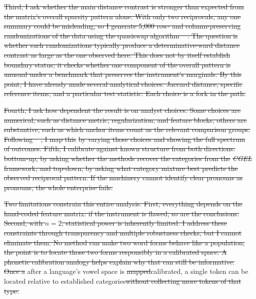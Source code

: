 \documentclass[12pt]{article}
\providecommand{\DIFaddtex}[1]{{\protect\color{DIFgreen}#1}} %
\providecommand{\DIFdeltex}[1]{{\protect\color{red}\sout{#1}}}                      %
\providecommand{\DIFaddbegin}{} %
\providecommand{\DIFaddend}{} %
\providecommand{\DIFdelbegin}{} %
\providecommand{\DIFdelend}{} %
\providecommand{\DIFadd}[1]{\texorpdfstring{\DIFaddtex{#1}}{#1}} %
\providecommand{\DIFdel}[1]{\texorpdfstring{\DIFdeltex{#1}}{}} %
\newcommand{\DIFscaledelfig}{0.5}
\newlength{\DIFdelgraphicswidth} %
\newlength{\DIFdelgraphicsheight} %
\newcommand{\DIFaddincludegraphics}[2][]{{\color{DIFgreen}\fbox{\DIFOincludegraphics[#1]{#2}}}} %
\newcommand{\DIFdelincludegraphics}[2][]{%
\sbox{\DIFdelgraphicsbox}{\DIFOincludegraphics[#1]{#2}}%
\settoboxwidth{\DIFdelgraphicswidth}{\DIFdelgraphicsbox} %
\settoboxtotalheight{\DIFdelgraphicsheight}{\DIFdelgraphicsbox} %
\scalebox{\DIFscaledelfig}{%
\parbox[b]{\DIFdelgraphicswidth}{\usebox{\DIFdelgraphicsbox}\\[-\baselineskip] \rule{\DIFdelgraphicswidth}{0em}}\llap{\resizebox{\DIFdelgraphicswidth}{\DIFdelgraphicsheight}{%
\setlength{\unitlength}{\DIFdelgraphicswidth}%
\begin{picture}(1,1)%
\thicklines\linethickness{2pt} %
{\color[rgb]{1,0,0}\put(0,0){\framebox(1,1){}}}%
{\color[rgb]{1,0,0}\put(0,0){\line( 1,1){1}}}%
{\color[rgb]{1,0,0}\put(0,1){\line(1,-1){1}}}%
\end{picture}%
}\hspace*{3pt}}} %
} %
\DeclareRobustCommand{\DIFaddbegin}{\DIFOaddbegin \let\includegraphics\DIFaddincludegraphics} %
\DeclareRobustCommand{\DIFaddend}{\DIFOaddend \let\includegraphics\DIFOincludegraphics} %
\DeclareRobustCommand{\DIFdelbegin}{\DIFOdelbegin \let\includegraphics\DIFdelincludegraphics} %
\DeclareRobustCommand{\DIFdelend}{\DIFOaddend \let\includegraphics\DIFOincludegraphics} %
\begin{document}
\DIFdel{Third, I ask whether the main distance contrast is stronger than expected from the matrix's overall sparsity pattern alone. With only two reciprocals, any one summary could be misleading, so I generate 5,000 row- and column-preserving randomizations of the data using the quasiswap algorithm \mbox{%
\parencite{miklos2004randomization}}\hskip0pt%
. The question is whether such randomizations typically produce a determinative-ward distance contrast as large as the one observed here. This does not by itself establish boundary status; it checks whether one component of the overall pattern is unusual under a benchmark that preserves the instrument's marginals. By this point, I have already made several analytical choices: Jaccard distance, specific reference items, and a particular test statistic. Each choice is a fork in the path.
}%

\DIFdel{Fourth, I ask how dependent the result is on analyst choices. Some choices are numerical, such as distance metric, regularization, and feature blocks; others are substantive, such as which anchor items count as the relevant comparison groups. Following \mbox{%
\textcite{GelmanLoken2013}}\hskip0pt%
, I map this }%
\DIFdel{by varying those choices and showing the full spectrum of outcomes. Fifth, I calibrate against known structure from both directions: bottom-up, by asking whether the methods recover the categories from the }\textit{\DIFdel{CGEL}} %
\DIFdel{framework; and top-down, by asking what category mixture best predicts the observed reciprocal pattern. If the machinery cannot identify clear pronouns as pronouns, the whole enterprise fails.
}%

\DIFdel{Two limitations constrain this entire analysis. First, everything depends on the hand-coded feature matrix: if the instrument is flawed, so are the conclusions. Second, with $n = 2$, statistical power is inherently limited. I address these constraints through transparency and multiple robustness checks, but I cannot eliminate them. No method can make two word forms behave like a population; the point is to locate those two forms responsibly in a calibrated space. A phonetic calibration analogy helps explain why that can still be informative. Once a }\DIFdelend \DIFaddbegin \DIFadd{after a }\DIFaddend language's vowel space is \DIFdelbegin \DIFdel{mapped}\DIFdelend \DIFaddbegin \DIFadd{calibrated}\DIFaddend , a single token can be located relative to established categories\DIFdelbegin \DIFdel{without collecting more tokens of that type. }%
\end{document}
